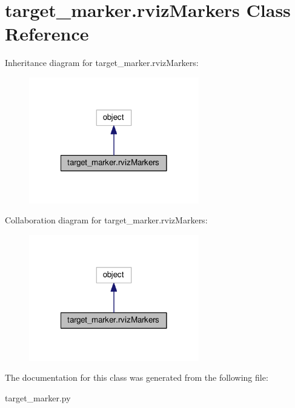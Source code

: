 \hypertarget{classtarget__marker_1_1rvizMarkers}{\section{target\-\_\-marker.\-rviz\-Markers Class Reference}
\label{classtarget__marker_1_1rvizMarkers}
}


Inheritance diagram for target\-\_\-marker.\-rviz\-Markers\-:
\nopagebreak
\begin{figure}[H]
\begin{center}
\leavevmode
\includegraphics[width=210pt]{classtarget__marker_1_1rvizMarkers__inherit__graph}
\end{center}
\end{figure}


Collaboration diagram for target\-\_\-marker.\-rviz\-Markers\-:
\nopagebreak
\begin{figure}[H]
\begin{center}
\leavevmode
\includegraphics[width=210pt]{classtarget__marker_1_1rvizMarkers__coll__graph}
\end{center}
\end{figure}


The documentation for this class was generated from the following file\-:\begin{DoxyCompactItemize}
\item 
target\-\_\-marker.\-py\end{DoxyCompactItemize}
